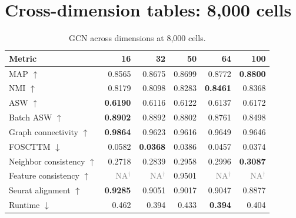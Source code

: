 \documentclass[10pt]{article}
\begin{document}
\section{Cross-dimension tables: 8,000 cells}
\begin{table}[H]\centering\scriptsize
\caption{GCN across dimensions at 8,000 cells.}
\begin{tabular}{@{}lrrrrr@{}}\toprule
Metric & 16 & 32 & 50 & 64 & 100 \\\midrule
MAP $\uparrow$ & 0.8565 & 0.8675 & 0.8699 & 0.8772 & \textbf{0.8800} \\
NMI $\uparrow$ & 0.8179 & 0.8098 & 0.8283 & \textbf{0.8461} & 0.8368 \\
ASW $\uparrow$ & \textbf{0.6190} & 0.6116 & 0.6122 & 0.6137 & 0.6172 \\
Batch ASW $\uparrow$ & \textbf{0.8902} & 0.8892 & 0.8802 & 0.8761 & 0.8498 \\
Graph connectivity $\uparrow$ & \textbf{0.9864} & 0.9623 & 0.9616 & 0.9649 & 0.9646 \\
FOSCTTM $\downarrow$ & 0.0582 & \textbf{0.0368} & 0.0386 & 0.0457 & 0.0374 \\
Neighbor consistency $\uparrow$ & 0.2718 & 0.2839 & 0.2958 & 0.2996 & \textbf{0.3087} \\
Feature consistency $\uparrow$ & \textcolor{gray}{NA$^{\dagger}$} & \textcolor{gray}{NA$^{\dagger}$} & 0.9501 & \textcolor{gray}{NA$^{\dagger}$} & \textcolor{gray}{NA$^{\dagger}$} \\
Seurat alignment $\uparrow$ & \textbf{0.9285} & 0.9051 & 0.9017 & 0.9047 & 0.8877 \\
Runtime $\downarrow$ & 0.462 & 0.394 & 0.433 & \textbf{0.394} & 0.404 \\
\bottomrule\end{tabular}\end{table}
\end{document}

